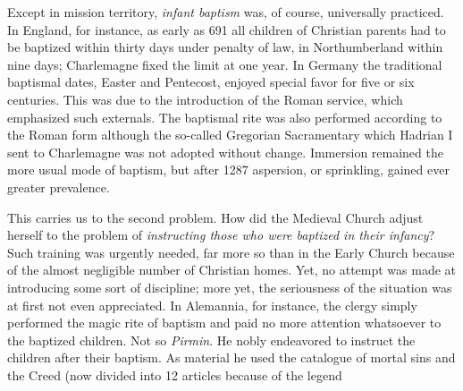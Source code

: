 Except in mission territory, \emph{infant baptism} was, of course, universally practiced. In England, for instance, as early as 691 all children of Christian parents had to be baptized within thirty days under penalty of law, in Northumberland within nine days; Charlemagne fixed the limit at one year. In Germany the traditional baptismal dates, Easter and Pentecost, enjoyed special favor for five or six centuries. This was due to the introduction of the Roman service, which emphasized such externals. The baptismal rite was also performed according to the Roman form although the so-called Gregorian Sacramentary which Hadrian I sent to Charlemagne was not adopted without change. Immersion remained the more usual mode of baptism, but after 1287 aspersion, or sprinkling, gained ever greater prevalence.

This carries us to the second problem. How did the Medieval Church adjust herself to the problem of \emph{instructing those who were baptized in their infancy}? Such training was urgently needed, far more so than in the Early Church because of the almost negligible number of Christian homes. Yet, no attempt was made at introducing some sort of discipline; more yet, the seriousness of the situation was at first not even appreciated. In Alemannia, for instance, the clergy simply performed the magic rite of baptism and paid no more attention whatsoever to the baptized children. Not so \emph{Pirmin}. He nobly endeavored to instruct the children after their baptism. As material he used the catalogue of mortal sins and the Creed (now divided into 12 articles because of the legend
